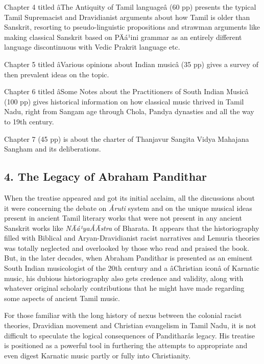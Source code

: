 Chapter 4 titled âThe Antiquity of Tamil languageâ (60 pp) presents the typical Tamil Supremacist and Dravidianist arguments about how Tamil is older than Sanskrit, resorting to pseudo-linguistic propositions and strawman arguments like making classical Sanskrit based on PÄá¹ini grammar as an entirely different language discontinuous with Vedic Prakrit language etc.

Chapter 5 titled âVarious opinions about Indian musicâ (35 pp) gives a survey of then prevalent ideas on the topic.

Chapter 6 titled âSome Notes about the Practitioners of South Indian Musicâ (100 pp) gives historical information on how classical music thrived in Tamil Nadu, right from Sangam age through Chola, Pandya dynasties and all the way to 19th century.

Chapter 7 (45 pp) is about the charter of Thanjavur Sangita Vidya Mahajana Sangham and its deliberations.


\subsection*{4. The Legacy of Abraham Pandithar}

When the treatise appeared and got its initial acclaim, all the discussions about it were concerning the debate on \textit{Åruti} system and on the unique musical ideas present in ancient Tamil literary works that were not present in any ancient Sanskrit works like \textit{NÄá¹­yaÅÄstra} of Bharata. It appears that the historiography filled with Biblical and Aryan-Dravidianist racist narratives and Lemuria theories was totally neglected and overlooked by those who read and praised the book. But, in the later decades, when Abraham Pandithar is presented as an eminent South Indian musicologist of the 20th century and a âChristian iconâ of Karnatic music, his dubious historiography also gets credence and validity, along with whatever original scholarly contributions that he might have made regarding some aspects of ancient Tamil music.

For those familiar with the long history of nexus between the colonial racist theories, Dravidian movement and Christian evangelism in Tamil Nadu, it is not difficult to speculate the logical consequences of Panditharâs legacy. His treatise is positioned as a powerful tool in furthering the attempts to appropriate and even digest Karnatic music partly or fully into Christianity.

